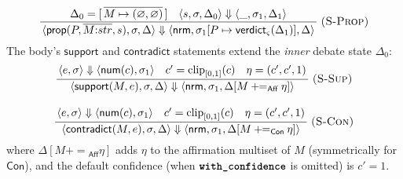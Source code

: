 \documentclass[11pt,a4paper]{article}
\theoremstyle{plain}
\theoremstyle{definition}
\theoremstyle{remark}
\newcommand{\tm}[1]{\textbf{\texttt{#1}}}                 %
\newcommand{\rn}[1]{\textsc{#1}}                          %
\newcommand{\evalto}{\Downarrow}
\newcommand{\env}{\sigma}
\newcommand{\Unit}{[0,1]}
\newcommand{\nrm}{\mathsf{nrm}}
\newcommand{\Strat}{\varsigma}
\newcommand{\infrule}[3]{%
  \ensuremath{\displaystyle\frac{\,#2\,}{\,#3\,}}\;\rn{(#1)}}
\begin{document}
\begin{gather*}
\infrule{S-Prop}{\Delta_0=[\,\overline{M\mapsto(\varnothing,\varnothing)}\,]\quad
                 \langle s,\env,\Delta_0\rangle\evalto\langle\_,\env_1,
                 \Delta_1\rangle}
                {\langle\mathsf{prop}(P,\overline{M{:}str},s),\env,\Delta\rangle
                 \evalto\langle\nrm,\env_1[P\mapsto
                 \mathsf{verdict}_\Strat(\Delta_1)],\Delta\rangle}
\end{gather*}
The body's $\mathsf{support}$ and $\mathsf{contradict}$ statements extend the
\emph{inner} debate state $\Delta_0$:
\begin{gather*}
\infrule{S-Sup}{\langle e,\env\rangle\evalto\langle\mathsf{num}(c),\env_1
                \rangle\quad c'=\mathrm{clip}_{\Unit}(c)\quad
                \eta=(c',c',1)}
               {\langle\mathsf{support}(M,e),\env,\Delta\rangle\evalto
                \langle\nrm,\env_1,\Delta[M\mathbin{+\!\!=}_{\mathsf{Aff}}\eta]
                \rangle}\\[10pt]
\infrule{S-Con}{\langle e,\env\rangle\evalto\langle\mathsf{num}(c),\env_1
                \rangle\quad c'=\mathrm{clip}_{\Unit}(c)\quad
                \eta=(c',c',1)}
               {\langle\mathsf{contradict}(M,e),\env,\Delta\rangle\evalto
                \langle\nrm,\env_1,\Delta[M\mathbin{+\!\!=}_{\mathsf{Con}}\eta]
                \rangle}
\end{gather*}
where $\Delta[M\mathbin{+\!\!=}_{\mathsf{Aff}}\eta]$ adds $\eta$ to the
affirmation multiset of $M$ (symmetrically for $\mathsf{Con}$), and the default
confidence (when $\tm{with\_confidence}$ is omitted) is $c'=1$.
\end{document}
